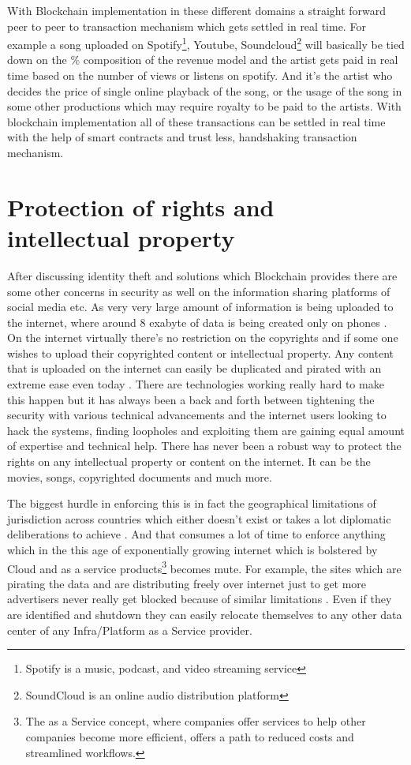 With Blockchain implementation in these different domains a straight forward peer to peer to transaction mechanism which gets settled in real time. For example a song uploaded on Spotify\footnote{Spotify is a music, podcast, and video streaming service}, Youtube, Soundcloud\footnote{SoundCloud is an online audio distribution platform} will basically be tied down on the \% composition of the revenue model and the artist gets paid in real time based on the number of views or listens on spotify. And it's the artist who decides the price of single online playback of the song, or the usage of the song in some other productions which may require royalty to be paid to the artists. With blockchain implementation all of these transactions can be settled in real time with the help of smart contracts and trust less, handshaking transaction mechanism.


\section{Protection of rights and intellectual property}
After discussing identity theft and solutions which Blockchain provides there are some other concerns in security as well on the information sharing platforms of social media etc. As very very large amount of information is being uploaded to the internet, where around 8 exabyte of data is being created only on phones \cite{jeff26}. On the internet virtually there's no restriction on the copyrights and if some one wishes to upload their copyrighted content or intellectual property. Any content that is uploaded on the internet can easily be duplicated and pirated with an extreme ease even today \cite{anita27}. There are technologies working really hard to make this happen but it has always been a back and forth between tightening the security with various technical advancements and the internet users looking to hack the systems, finding loopholes and exploiting them are gaining equal amount of expertise and technical help. There has never been a robust way to protect the rights on any intellectual property or content on the internet. It can be the movies, songs, copyrighted documents and much more.

The biggest hurdle in enforcing this is in fact the geographical limitations of jurisdiction across countries which either doesn't exist or takes a lot diplomatic deliberations to achieve \cite{anita27}. And that consumes a lot of time to enforce anything which in the this age of exponentially growing internet which is bolstered by Cloud and as a service products\footnote{The as a Service concept, where companies offer services to help other companies become more efficient, offers a path to reduced costs and streamlined workflows.} becomes mute. For example, the sites which are pirating the data and are distributing freely over internet just to get more advertisers never really get blocked because of similar limitations \cite{ian28}. Even if they are identified  and shutdown they can easily relocate themselves to any other data center of any Infra/Platform as a Service provider.

